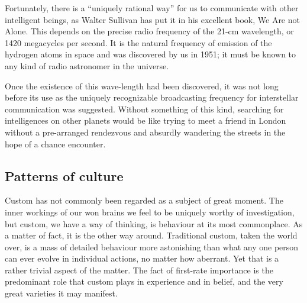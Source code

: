 \documentclass[11pt]{article}
\begin{document}
Fortunately, there is a ``uniquely rational way'' for us to communicate with other intelligent beings, as Walter Sullivan has put it in his excellent book, We Are not Alone. This depends on the precise radio frequency of the 21-cm wavelength, or 1420 megacycles per second. It is the natural frequency of emission of the hydrogen atoms in space and was discovered by us in 1951; it must be known to any kind of radio astronomer in the universe.

Once the existence of this wave-length had been discovered, it was not long before its use as the uniquely recognizable broadcasting frequency for interstellar communication was suggested. Without something of this kind, searching for intelligences on other planets would be like trying to meet a friend in London without a pre-arranged rendezvous and absurdly wandering the streets in the hope of a chance encounter.
\subsection{Patterns of culture}
\label{sec-2-44}

Custom has not commonly been regarded as a subject of great moment. The inner workings of our won brains we feel to be uniquely worthy of investigation, but custom, we have a way of thinking, is behaviour at its most commonplace. As a matter of fact, it is the other way around. Traditional custom, taken the world over, is a mass of detailed behaviour more astonishing than what any one person can ever evolve in individual actions, no matter how aberrant. Yet that is a rather trivial aspect of the matter. The fact of first-rate importance is the predominant role that custom plays in experience and in belief, and the very great varieties it may manifest.
\end{document}
